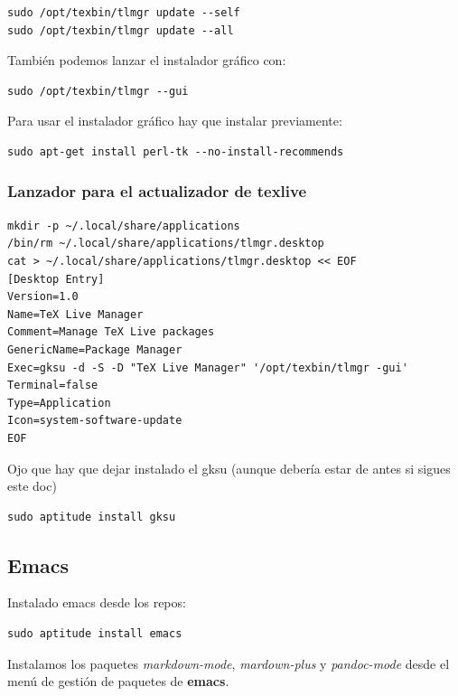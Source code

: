 \documentclass[12pt,spanish,]{scrartcl}
\begin{document}
\begin{verbatim}
sudo /opt/texbin/tlmgr update --self
sudo /opt/texbin/tlmgr update --all
\end{verbatim}

También podemos lanzar el instalador gráfico con:

\begin{verbatim}
sudo /opt/texbin/tlmgr --gui
\end{verbatim}

Para usar el instalador gráfico hay que instalar previamente:

\begin{verbatim}
sudo apt-get install perl-tk --no-install-recommends
\end{verbatim}

\subsubsection{Lanzador para el actualizador de
texlive}\label{lanzador-para-el-actualizador-de-texlive}

\begin{verbatim}
mkdir -p ~/.local/share/applications
/bin/rm ~/.local/share/applications/tlmgr.desktop
cat > ~/.local/share/applications/tlmgr.desktop << EOF
[Desktop Entry]
Version=1.0
Name=TeX Live Manager
Comment=Manage TeX Live packages
GenericName=Package Manager
Exec=gksu -d -S -D "TeX Live Manager" '/opt/texbin/tlmgr -gui'
Terminal=false
Type=Application
Icon=system-software-update
EOF
\end{verbatim}

Ojo que hay que dejar instalado el gksu (aunque debería estar de antes
si sigues este doc)

\begin{verbatim}
sudo aptitude install gksu
\end{verbatim}

\subsection{Emacs}\label{emacs}

Instalado emacs desde los repos:

\begin{verbatim}
sudo aptitude install emacs
\end{verbatim}

Instalamos los paquetes \emph{markdown-mode}, \emph{mardown-plus} y
\emph{pandoc-mode} desde el menú de gestión de paquetes de
\textbf{emacs}.
\end{document}
